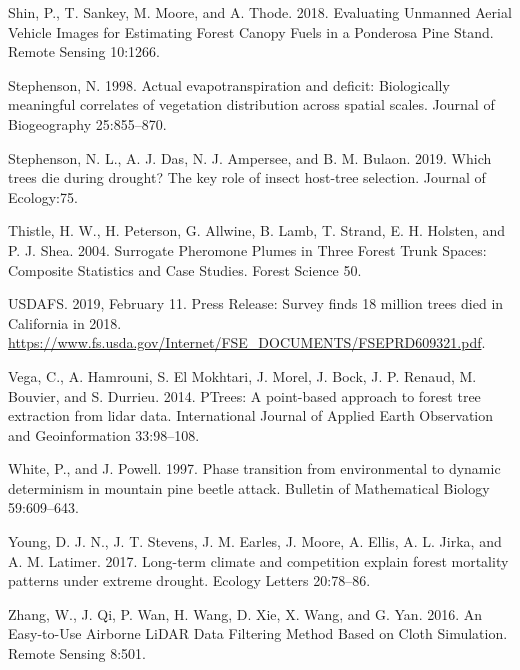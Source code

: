 \documentclass[]{article}
\begin{document}
\hypertarget{ref-shin2018}{}
Shin, P., T. Sankey, M. Moore, and A. Thode. 2018. Evaluating Unmanned
Aerial Vehicle Images for Estimating Forest Canopy Fuels in a Ponderosa
Pine Stand. Remote Sensing 10:1266.

\hypertarget{ref-stephenson1998}{}
Stephenson, N. 1998. Actual evapotranspiration and deficit: Biologically
meaningful correlates of vegetation distribution across spatial scales.
Journal of Biogeography 25:855--870.

\hypertarget{ref-stephenson2019}{}
Stephenson, N. L., A. J. Das, N. J. Ampersee, and B. M. Bulaon. 2019.
Which trees die during drought? The key role of insect host-tree
selection. Journal of Ecology:75.

\hypertarget{ref-thistle2004}{}
Thistle, H. W., H. Peterson, G. Allwine, B. Lamb, T. Strand, E. H.
Holsten, and P. J. Shea. 2004. Surrogate Pheromone Plumes in Three
Forest Trunk Spaces: Composite Statistics and Case Studies. Forest
Science 50.

\hypertarget{ref-usdafs2019}{}
USDAFS. 2019, February 11. Press Release: Survey finds 18 million trees
died in California in 2018.
\url{https://www.fs.usda.gov/Internet/FSE_DOCUMENTS/FSEPRD609321.pdf}.

\hypertarget{ref-vega2014}{}
Vega, C., A. Hamrouni, S. El Mokhtari, J. Morel, J. Bock, J. P. Renaud,
M. Bouvier, and S. Durrieu. 2014. PTrees: A point-based approach to
forest tree extraction from lidar data. International Journal of Applied
Earth Observation and Geoinformation 33:98--108.

\hypertarget{ref-white1997}{}
White, P., and J. Powell. 1997. Phase transition from environmental to
dynamic determinism in mountain pine beetle attack. Bulletin of
Mathematical Biology 59:609--643.

\hypertarget{ref-young2017}{}
Young, D. J. N., J. T. Stevens, J. M. Earles, J. Moore, A. Ellis, A. L.
Jirka, and A. M. Latimer. 2017. Long-term climate and competition
explain forest mortality patterns under extreme drought. Ecology Letters
20:78--86.

\hypertarget{ref-zhang2016}{}
Zhang, W., J. Qi, P. Wan, H. Wang, D. Xie, X. Wang, and G. Yan. 2016. An
Easy-to-Use Airborne LiDAR Data Filtering Method Based on Cloth
Simulation. Remote Sensing 8:501.
\end{document}
